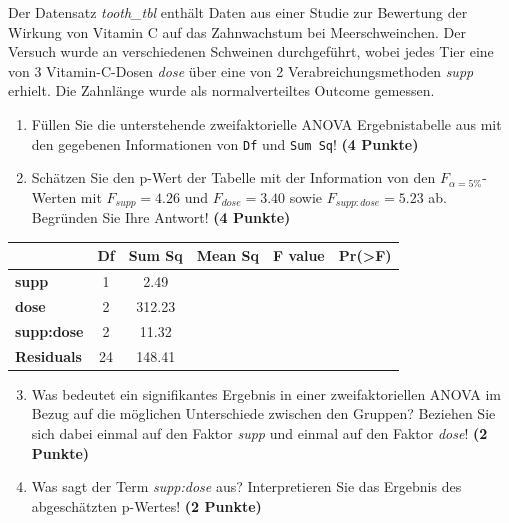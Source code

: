 \documentclass[a4paper, 9pt]{scrartcl}\usepackage[]{graphicx}\usepackage[]{xcolor}
\begin{document}
Der Datensatz \textit{tooth\_tbl} enth{\"a}lt Daten aus einer Studie zur
Bewertung der Wirkung von Vitamin C auf das Zahnwachstum bei
Meerschweinchen. Der Versuch wurde an verschiedenen Schweinen durchgef{\"u}hrt,
wobei jedes Tier eine von 3 Vitamin-C-Dosen \textit{dose}
{\"u}ber eine von 2 Verabreichungsmethoden \textit{supp}
erhielt. Die Zahnl{\"a}nge wurde als normalverteiltes Outcome gemessen.



\begin{enumerate}
\item F{\"u}llen Sie die unterstehende zweifaktorielle ANOVA Ergebnistabelle aus
  mit den gegebenen Informationen von \texttt{Df} und \texttt{Sum Sq}!
  \textbf{(4 Punkte)}
\item Sch{\"a}tzen Sie den p-Wert der Tabelle mit der Information von den
  $F_{\alpha = 5\%}$-Werten mit
  $F_{supp} = 4.26$ und
  $F_{dose} = 3.40$ sowie
  $F_{supp:dose} = 5.23$ ab. Begr{\"u}nden Sie Ihre
  Antwort! \textbf{(4 Punkte)}
\end{enumerate}

\vspace{1Ex}

\begin{center}
  \Large
  \begin{tabular}{l|c|c|c|c|c}
     & \textbf{Df} & \textbf{Sum Sq} & \textbf{Mean Sq} & \textbf{F value} & \textbf{Pr(>F)} \strut\\
    \hline
   \textbf{supp}  & 1 & 2.49 &  &  &  \strut\\
    \hline
    \textbf{dose}  & 2 & 312.23 &  &  &  \strut\\
    \hline
    \textbf{supp:dose}  & 2 & 11.32 &  &  &  \strut\\
    \hline
   \textbf{Residuals}  & 24 & 148.41 &  &  &  \strut\\
  \end{tabular}
\end{center}

\vspace{1Ex}

\begin{enumerate}
  \setcounter{enumi}{2}
\item Was bedeutet ein signifikantes Ergebnis in einer zweifaktoriellen
  ANOVA im Bezug auf die m{\"o}glichen Unterschiede zwischen den Gruppen?
  Beziehen Sie sich dabei einmal auf den Faktor \textit{supp} und einmal
  auf den Faktor \textit{dose}! \textbf{(2 Punkte)}
\item Was sagt der Term \textit{supp:dose} aus? Interpretieren Sie das
  Ergebnis des abgesch{\"a}tzten p-Wertes! \textbf{(2 Punkte)}
\end{enumerate}
 
\end{document}
